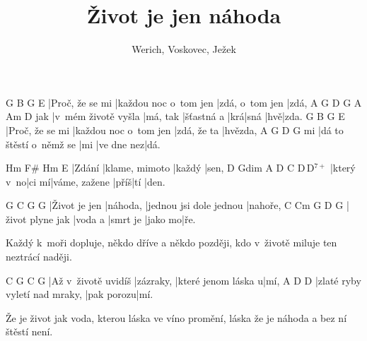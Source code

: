 \documentclass{song}
\title{Život je jen náhoda}
\author{Werich, Voskovec, Ježek}
\begin{document}
\strophe
G               B\7                   G               E
|Proč, že se mi |každou noc o~tom jen |zdá, o~tom jen |zdá,
    A\7                 G         D\7        G   A\7  Am  D\7
jak |v~mém životě vyšla |má, tak |šťastná a |krá|sná |hvě|zda.
G               B\7                   G           E
|Proč, že se mi |každou noc o~tom jen |zdá, že ta |hvězda,
   A\7                     G   D\7        G
mi |dá to štěstí o~němž se |mi |ve dne nez|dá.
\endstrophe

\strophe
Hm     F\#            Hm     E\7
|Zdání |klame, mimoto |každý |sen,
D          Gdim  A\7           D    C   D\7\,D$^{7+}$
|který v~no|ci mí|váme, zažene |příš|tí |den.
\endstrophe


G             C\7      G                       G\7
|Život je jen |náhoda, |jednou jsi dole jednou |nahoře,
C                Cm      G        D\7     G
|život plyne jak |voda a |smrt je |jako mo|ře.
\endstrophe

Každý k~moři dopluje, někdo dříve a někdo později,
kdo v~životě miluje ten neztrácí naději.
\endstrophe

\strophe
C                   G         C                   G
|Až v~životě uvidíš |zázraky, |které jenom láska u|mí,
A\7                           D          D\7
|zlaté ryby vyletí nad mraky, |pak porozu|mí.
\endstrophe

Že je život jak voda, kterou láska ve víno promění,
láska že je náhoda a bez ní štěstí není.
\endstrophe
\end{document}
